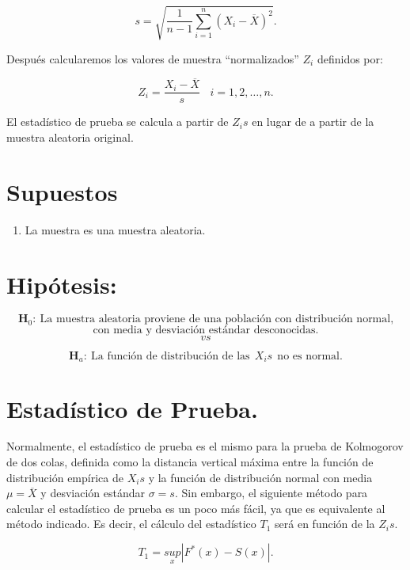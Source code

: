 \documentclass[
  a4paper,
  oneside,
  openany]{book}
\providecommand{\tightlist}{%
  \setlength{\itemsep}{0pt}\setlength{\parskip}{0pt}}
\begin{document}
\[s=\sqrt{\frac{1}{n-1}\sum_{i=1}^{n}(X_{i}-\overline{X})^2}.\]

Después calcularemos los valores de muestra ``normalizados'' \(Z_{i}\) definidos por:

\[Z_{i}=\frac{X_{i}-\overline{X}}{s} \ \ \ \ i=1,2,\ldots,n.\]

El estadístico de prueba se calcula a partir de \(Z_{i}s\) en lugar de a partir de la muestra aleatoria original.

\hypertarget{supuestos-14}{%
\section{Supuestos}\label{supuestos-14}}

\begin{enumerate}
\def\labelenumi{\arabic{enumi})}
\tightlist
\item
  La muestra es una muestra aleatoria.
\end{enumerate}

\hypertarget{hipuxf3tesis-15}{%
\section{Hipótesis:}\label{hipuxf3tesis-15}}

\[\textbf{H}_0: \ \mbox{La muestra aleatoria proviene de una población con distribución normal,}\]
\[\mbox{con media y desviación estándar desconocidas.}\]
\[vs\]

\[\textbf{H}_a: \ \mbox{La función de distribución de las} \ \ X_{i}s \ \  \mbox{no es normal.}\]

\hypertarget{estaduxedstico-de-prueba.}{%
\section{Estadístico de Prueba.}\label{estaduxedstico-de-prueba.}}

Normalmente, el estadístico de prueba es el mismo para la prueba de Kolmogorov de dos colas, definida como la distancia vertical máxima entre la función de distribución empírica de \(X_{i}s\) y la función de distribución normal con media \(\mu=\overline{X}\) y desviación estándar \(\sigma=s\).
Sin embargo, el siguiente método para calcular el estadístico de prueba es un poco más fácil, ya que es equivalente al método indicado. Es decir, el cálculo del estadístico \(T_{1}\) será en función de la \(Z_{i}s\).

\[T_{1}=\underset{x}{sup}|F^*(x)-S(x)|.\]
\end{document}
